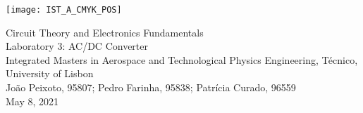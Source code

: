 
\thispagestyle {empty}

\texttt{[image: IST\_A\_CMYK\_POS]}


\begin{center}
\linespread{1.3}
%
\vspace{1.0cm}

\vspace{1cm}
{\FontLb Circuit Theory and Electronics Fundamentals} \\
\vspace{1cm}
{\FontLb Laboratory 3: AC/DC Converter} \\
\vspace{2cm}
{\FontSn Integrated Masters in Aerospace and Technological Physics Engineering, Técnico, University of Lisbon} \\ %
\vspace{1cm}
{\FontSn João Peixoto, 95807; Pedro Farinha, 95838; Patrícia Curado, 96559} \\
\vspace{1cm}
{\FontSn May 8, 2021} \\ %
\par
%
\end{center}


